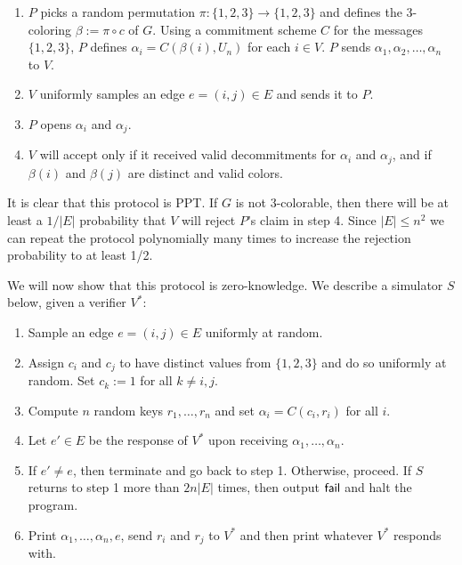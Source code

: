 \documentclass[12pt]{tufte-book}
\begin{document}
\begin{enumerate}
\item $P$ picks a random permutation $\pi : \{ 1, 2, 3 \} \to \{ 1, 2, 3 \}$ and defines the 3-coloring $\beta := \pi \circ c$ of $G$. Using a commitment scheme $C$ for the messages $\{ 1, 2, 3 \}$, $P$ defines $\alpha_i = C(\beta(i), U_n)$ for each $i \in V$. $P$ sends $\alpha_1, \alpha_2, \ldots, \alpha_n$ to $V$.

\item $V$ uniformly samples an edge $e = (i, j) \in E$ and sends it to $P$.

\item $P$ opens $\alpha_i$ and $\alpha_j$.

\item $V$ will accept only if it received valid decommitments for $\alpha_i$ and $\alpha_j$, and if $\beta(i)$ and $\beta(j)$ are distinct and valid colors.

\end{enumerate}

It is clear that this protocol is PPT. If $G$ is not 3-colorable, then there will be at least a $1/|E|$ probability that $V$ will reject $P$'s claim in step 4. Since $|E| \leq n^2$ we can repeat the protocol polynomially many times to increase the rejection probability to at least 1/2.

We will now show that this protocol is zero-knowledge. We describe a simulator $S$ below, given a verifier $V^*$: \begin{enumerate}
\item Sample an edge $e = (i, j) \in E$ uniformly at random.

\item Assign $c_i$ and $c_j$ to have distinct values from $\{ 1, 2, 3 \}$ and do so uniformly at random. Set $c_k := 1$ for all $k \neq i, j$.

\item Compute $n$ random keys $r_1, \ldots, r_n$ and set $\alpha_i = C(c_i, r_i)$ for all $i$.

\item Let $e' \in E$ be the response of $V^*$ upon receiving $\alpha_1, \ldots, \alpha_n$.

\item If $e' \neq e$, then terminate and go back to step 1. Otherwise, proceed. If $S$ returns to step 1 more than $2n |E|$ times, then output $\sf{fail}$ and halt the program.

\item Print $\alpha_1, \ldots, \alpha_n, e$, send $r_i$ and $r_j$ to $V^*$ and then print whatever $V^*$ responds with.
\end{enumerate}
\end{document}
